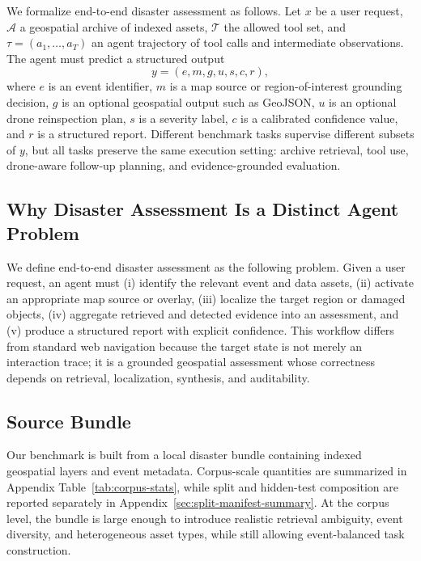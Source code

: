 \documentclass{article}
\begin{document}
We formalize end-to-end disaster assessment as follows. Let $x$ be a user request, $\mathcal{A}$ a geospatial archive of indexed assets, $\mathcal{T}$ the allowed tool set, and $\tau=(a_1,\ldots,a_T)$ an agent trajectory of tool calls and intermediate observations. The agent must predict a structured output
\[
y = (e, m, g, u, s, c, r),
\]
where $e$ is an event identifier, $m$ is a map source or region-of-interest grounding decision, $g$ is an optional geospatial output such as GeoJSON, $u$ is an optional drone reinspection plan, $s$ is a severity label, $c$ is a calibrated confidence value, and $r$ is a structured report. Different benchmark tasks supervise different subsets of $y$, but all tasks preserve the same execution setting: archive retrieval, tool use, drone-aware follow-up planning, and evidence-grounded evaluation.

\subsection{Why Disaster Assessment Is a Distinct Agent Problem}

We define end-to-end disaster assessment as the following problem. Given a user request, an agent must (i) identify the relevant event and data assets, (ii) activate an appropriate map source or overlay, (iii) localize the target region or damaged objects, (iv) aggregate retrieved and detected evidence into an assessment, and (v) produce a structured report with explicit confidence. This workflow differs from standard web navigation because the target state is not merely an interaction trace; it is a grounded geospatial assessment whose correctness depends on retrieval, localization, synthesis, and auditability.

\subsection{Source Bundle}

Our benchmark is built from a local disaster bundle containing indexed geospatial layers and event metadata. Corpus-scale quantities are summarized in Appendix Table~\ref{tab:corpus-stats}, while split and hidden-test composition are reported separately in Appendix~\ref{sec:split-manifest-summary}. At the corpus level, the bundle is large enough to introduce realistic retrieval ambiguity, event diversity, and heterogeneous asset types, while still allowing event-balanced task construction.
\end{document}
